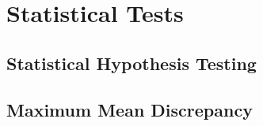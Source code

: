 \section{Statistical Tests}
\subsection{Statistical Hypothesis Testing}


\subsection{Maximum Mean Discrepancy}